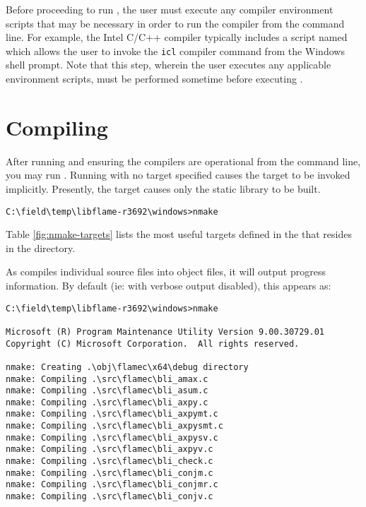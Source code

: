 Before proceeding to run \nmakens, the user must execute any compiler
environment scripts that may be necessary in order to run the compiler from
the command line.
For example, the Intel C/C++ compiler typically includes a script named which
allows the user to invoke the {\tt icl} compiler command from the Windows
shell prompt.
Note that this step, wherein the user executes any applicable environment
scripts, must be performed sometime before executing \nmakens.




\section{Compiling}


After running \configurecmd and ensuring the compilers are operational from
the command line, you may run \nmake.
Running \nmake with no target specified causes the \all target to be
invoked implicitly.
Presently, the \all target causes only the static library to be built.

\begin{Verbatim}[frame=single,framesep=2.5mm,xleftmargin=5mm,fontsize=\footnotesize]
C:\field\temp\libflame-r3692\windows>nmake
\end{Verbatim}

\noindent
Table \ref{fig:nmake-targets} lists the most useful \nmake targets defined
in the \makefile that resides in the \windows directory.

As \nmake compiles individual source files into object files, it will output
progress information.
By default (ie: with verbose output disabled), this appears as:

\begin{Verbatim}[frame=single,framesep=2.5mm,xleftmargin=5mm,fontsize=\footnotesize]
C:\field\temp\libflame-r3692\windows>nmake

Microsoft (R) Program Maintenance Utility Version 9.00.30729.01
Copyright (C) Microsoft Corporation.  All rights reserved.

nmake: Creating .\obj\flamec\x64\debug directory
nmake: Compiling .\src\flamec\bli_amax.c
nmake: Compiling .\src\flamec\bli_asum.c
nmake: Compiling .\src\flamec\bli_axpy.c
nmake: Compiling .\src\flamec\bli_axpymt.c
nmake: Compiling .\src\flamec\bli_axpysmt.c
nmake: Compiling .\src\flamec\bli_axpysv.c
nmake: Compiling .\src\flamec\bli_axpyv.c
nmake: Compiling .\src\flamec\bli_check.c
nmake: Compiling .\src\flamec\bli_conjm.c
nmake: Compiling .\src\flamec\bli_conjmr.c
nmake: Compiling .\src\flamec\bli_conjv.c
\end{Verbatim}

